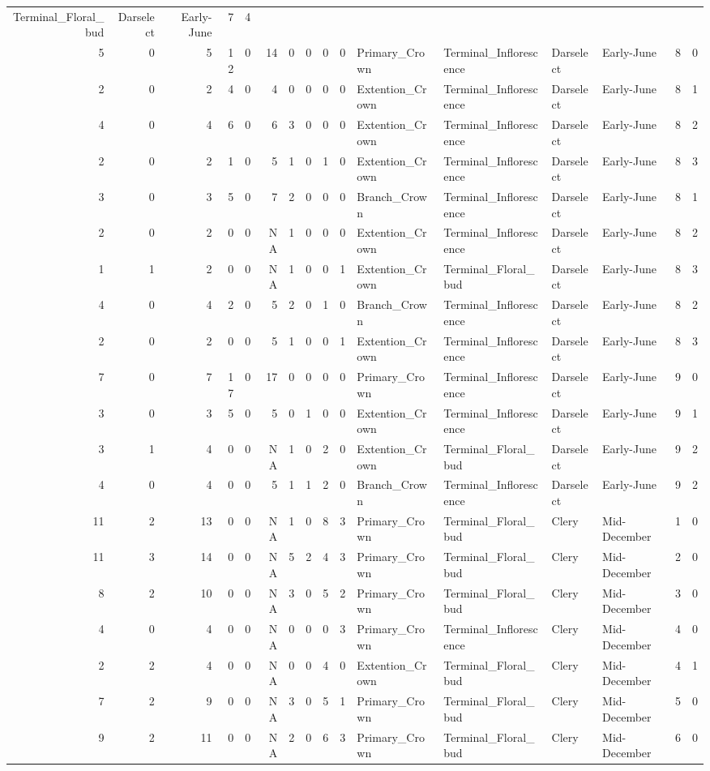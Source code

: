 \documentclass[]{article}
\begin{document}
\begin{longtable}[]{@{}rrrrrrrrrrllllrl@{}}
Terminal\_Floral\_bud & Darselect & Early-June & 7 & 4\tabularnewline
5 & 0 & 5 & 12 & 0 & 14 & 0 & 0 & 0 & 0 & Primary\_Crown &
Terminal\_Inflorescence & Darselect & Early-June & 8 & 0\tabularnewline
2 & 0 & 2 & 4 & 0 & 4 & 0 & 0 & 0 & 0 & Extention\_Crown &
Terminal\_Inflorescence & Darselect & Early-June & 8 & 1\tabularnewline
4 & 0 & 4 & 6 & 0 & 6 & 3 & 0 & 0 & 0 & Extention\_Crown &
Terminal\_Inflorescence & Darselect & Early-June & 8 & 2\tabularnewline
2 & 0 & 2 & 1 & 0 & 5 & 1 & 0 & 1 & 0 & Extention\_Crown &
Terminal\_Inflorescence & Darselect & Early-June & 8 & 3\tabularnewline
3 & 0 & 3 & 5 & 0 & 7 & 2 & 0 & 0 & 0 & Branch\_Crown &
Terminal\_Inflorescence & Darselect & Early-June & 8 & 1\tabularnewline
2 & 0 & 2 & 0 & 0 & NA & 1 & 0 & 0 & 0 & Extention\_Crown &
Terminal\_Inflorescence & Darselect & Early-June & 8 & 2\tabularnewline
1 & 1 & 2 & 0 & 0 & NA & 1 & 0 & 0 & 1 & Extention\_Crown &
Terminal\_Floral\_bud & Darselect & Early-June & 8 & 3\tabularnewline
4 & 0 & 4 & 2 & 0 & 5 & 2 & 0 & 1 & 0 & Branch\_Crown &
Terminal\_Inflorescence & Darselect & Early-June & 8 & 2\tabularnewline
2 & 0 & 2 & 0 & 0 & 5 & 1 & 0 & 0 & 1 & Extention\_Crown &
Terminal\_Inflorescence & Darselect & Early-June & 8 & 3\tabularnewline
7 & 0 & 7 & 17 & 0 & 17 & 0 & 0 & 0 & 0 & Primary\_Crown &
Terminal\_Inflorescence & Darselect & Early-June & 9 & 0\tabularnewline
3 & 0 & 3 & 5 & 0 & 5 & 0 & 1 & 0 & 0 & Extention\_Crown &
Terminal\_Inflorescence & Darselect & Early-June & 9 & 1\tabularnewline
3 & 1 & 4 & 0 & 0 & NA & 1 & 0 & 2 & 0 & Extention\_Crown &
Terminal\_Floral\_bud & Darselect & Early-June & 9 & 2\tabularnewline
4 & 0 & 4 & 0 & 0 & 5 & 1 & 1 & 2 & 0 & Branch\_Crown &
Terminal\_Inflorescence & Darselect & Early-June & 9 & 2\tabularnewline
11 & 2 & 13 & 0 & 0 & NA & 1 & 0 & 8 & 3 & Primary\_Crown &
Terminal\_Floral\_bud & Clery & Mid-December & 1 & 0\tabularnewline
11 & 3 & 14 & 0 & 0 & NA & 5 & 2 & 4 & 3 & Primary\_Crown &
Terminal\_Floral\_bud & Clery & Mid-December & 2 & 0\tabularnewline
8 & 2 & 10 & 0 & 0 & NA & 3 & 0 & 5 & 2 & Primary\_Crown &
Terminal\_Floral\_bud & Clery & Mid-December & 3 & 0\tabularnewline
4 & 0 & 4 & 0 & 0 & NA & 0 & 0 & 0 & 3 & Primary\_Crown &
Terminal\_Inflorescence & Clery & Mid-December & 4 & 0\tabularnewline
2 & 2 & 4 & 0 & 0 & NA & 0 & 0 & 4 & 0 & Extention\_Crown &
Terminal\_Floral\_bud & Clery & Mid-December & 4 & 1\tabularnewline
7 & 2 & 9 & 0 & 0 & NA & 3 & 0 & 5 & 1 & Primary\_Crown &
Terminal\_Floral\_bud & Clery & Mid-December & 5 & 0\tabularnewline
9 & 2 & 11 & 0 & 0 & NA & 2 & 0 & 6 & 3 & Primary\_Crown &
Terminal\_Floral\_bud & Clery & Mid-December & 6 & 0\tabularnewline

\end{longtable}
\end{document}
